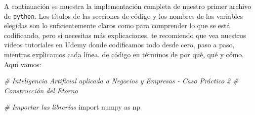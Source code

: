 \documentclass[]{book}
\newenvironment{Shaded}{\begin{snugshade}}{\end{snugshade}}
\newcommand{\CommentTok}[1]{\textcolor[rgb]{0.56,0.35,0.01}{\textit{#1}}}
\newcommand{\ImportTok}[1]{#1}
\newcommand{\NormalTok}[1]{#1}
\begin{document}
A continuación se muestra la implementación completa de nuestro primer archivo de \texttt{python}. Los títulos de las secciones de código y los nombres de las variables elegidas son lo suficientemente claros como para comprender lo que se está codificando, pero si necesitas más explicaciones, te recomiendo que vea nuestros videos tutoriales en Udemy donde codificamos todo desde cero, paso a paso, mientras explicamos cada línea. de código en términos de por qué, qué y cómo. Aquí vamos:

\begin{Shaded}
\begin{Highlighting}[]
\CommentTok{# Inteligencia Artificial aplicada a Negocios y Empresas - Caso Práctico 2}
\CommentTok{# Construcción del Etorno}

\CommentTok{# Importar las librerías}
\ImportTok{import}\NormalTok{ numpy }\ImportTok{as}\NormalTok{ np}
\end{Highlighting}
\end{Shaded}
\end{document}
